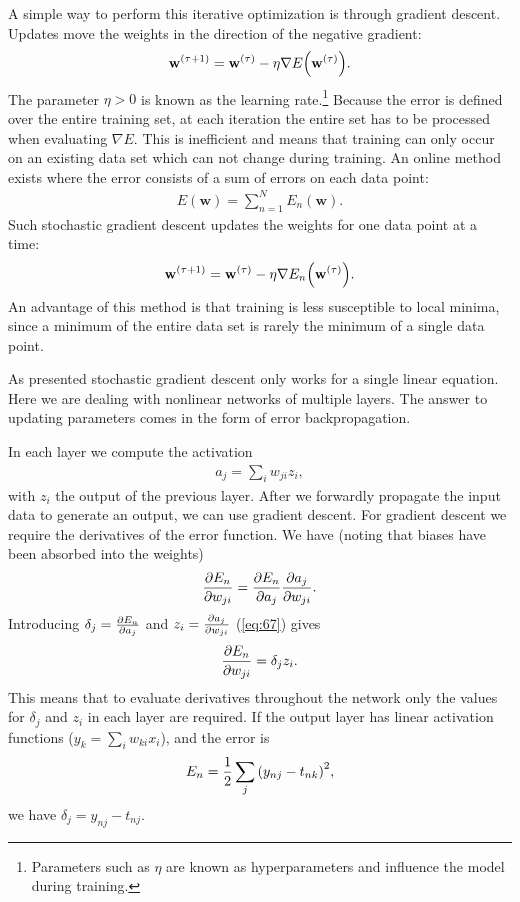\documentclass[11pt, a4paper]{report} %
\begin{document}
A simple way to perform this iterative optimization is through gradient descent.
Updates move the weights in the direction of the negative gradient:
\begin{align}
  \label{eq:63}
  \mathbf{w}^{(\tau+1)}=\mathbf{w}^{(\tau)}- \eta \nabla E\qty(\mathbf{w}^{(\tau)}).
\end{align}
The parameter \(\eta > 0\) is known as the learning rate.\footnote{Parameters such as \(\eta\) are known as hyperparameters and influence the model during training.}
Because the error is defined over the entire training set, at each iteration the entire set has to be processed when evaluating \(\nabla E\).
This is inefficient and means that training can only occur on an existing data set which can not change during training.
An online method exists where the error consists of a sum of errors on each data point:
\begin{align}
  \label{eq:64}
  E(\mathbf{w}) = \sum_{n=1}^{N} E_n(\mathbf{w}).
\end{align}
Such stochastic gradient descent updates the weights for one data point at a time:
\begin{align}
  \label{eq:65}
    \mathbf{w}^{(\tau+1)}=\mathbf{w}^{(\tau)}- \eta \nabla E_n\qty(\mathbf{w}^{(\tau)}).
\end{align}
An advantage of this method is that training is less susceptible to local minima, since a minimum of the entire data set is rarely the minimum of a single data point.

As presented stochastic gradient descent only works for a single linear equation.
Here we are dealing with nonlinear networks of multiple layers.
The answer to updating parameters comes in the form of error backpropagation.

In each layer we compute the activation
\begin{align}
  \label{eq:67}
  a_j= \sum_i w_{ji}z_i,
\end{align}
with \(z_i\) the output of the previous layer.
After we forwardly propagate the input data to generate an output, we can use gradient descent.
For gradient descent we require the derivatives of the error function.
We have (noting that biases have been absorbed into the weights)
\begin{align}
  \label{eq:66}
  \pdv{E_n}{w_{ji}} = \pdv{E_n}{a_j}\pdv{a_j}{w_{ji}}.
\end{align}
Introducing \(\delta_j = \pdv{E_n}{a_j}\) and \(z_i=\pdv{a_j}{w_{ji}}\) (\cref{eq:67}) gives
\begin{align}
  \label{eq:68}
  \pdv{E_n}{w_{ji}} = \delta_j z_i.
\end{align}
This means that to evaluate derivatives throughout the network only the values for \(\delta_j\) and \(z_i\) in each layer are required.
If the output layer has linear activation functions (\(y_k = \sum_i w_{ki}x_i\)), and the error is
\begin{align}
  \label{eq:69}
  E_n = \frac{1}{2} \sum_j {\qty(y_{nj}-t_{nk})}^2,
\end{align}
we have \(\delta_j=y_{nj}-t_{nj}\).
\end{document}
